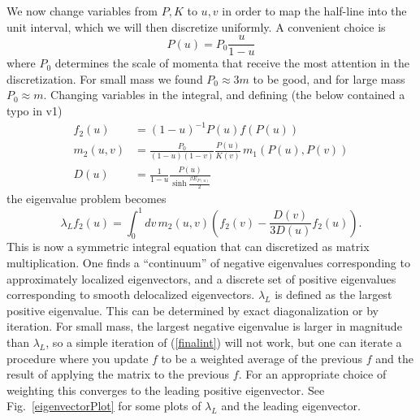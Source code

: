 \documentclass[12pt]{article}
\newcommand{\be}{\begin{equation}}
\newcommand{\ee}{\end{equation}}
\begin{document}
We now change variables from $P,K$ to $u,v$ in order to map the half-line into the unit interval, which we will then discretize uniformly. A convenient choice is
\be
P(u) = P_0\frac{u}{1-u}
\ee
where $P_0$ determines the scale of momenta that receive the most attention in the discretization. For small mass we found $P_0 \approx 3m$ to be good, and for large mass $P_0 \approx m$. Changing variables in the integral, and defining (the below contained a typo in v1)
\begin{align}
f_2(u) &= (1-u)^{-1} P(u) f(P(u))\\
m_2(u,v)&= \frac{P_0}{(1-u)(1-v)}\frac{P(u)}{K(v)}\,m_1(P(u),P(v))\\
D(u)&= \frac{1}{1-u}\frac{P(u)}{\sinh \frac{\beta E_{P(u)}}{2}}
\end{align}
the eigenvalue problem becomes
\be\label{finalint}
\lambda_L f_2(u) = \int_0^1 dv\, m_2(u,v)\left(f_2(v) - \frac{D(v)}{3D(u)}f_2(u)\right).
\ee
This is now a symmetric integral equation that can discretized as matrix multiplication. One finds a ``continuum'' of negative eigenvalues corresponding to approximately localized eigenvectors, and a discrete set of positive eigenvalues corresponding to smooth delocalized eigenvectors. $\lambda_L$ is defined as the largest positive eigenvalue. This can be determined by exact diagonalization or by iteration. For small mass, the largest negative eigenvalue is larger in magnitude than $\lambda_L$, so a simple iteration of (\ref{finalint}) will not work, but one can iterate a procedure where you update $f$ to be a weighted average of the previous $f$ and the result of applying the matrix to the previous $f$. For an appropriate choice of weighting this converges to the leading positive eigenvector. See Fig.~\ref{eigenvectorPlot} for some plots of $\lambda_L$ and the leading eigenvector.
\end{document}
